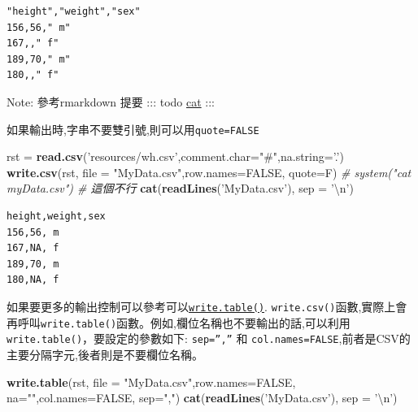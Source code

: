\documentclass[]{book}
\newenvironment{Shaded}{\begin{snugshade}}{\end{snugshade}}
\newcommand{\CharTok}[1]{\textcolor[rgb]{0.31,0.60,0.02}{#1}}
\newcommand{\CommentTok}[1]{\textcolor[rgb]{0.56,0.35,0.01}{\textit{#1}}}
\newcommand{\DataTypeTok}[1]{\textcolor[rgb]{0.13,0.29,0.53}{#1}}
\newcommand{\KeywordTok}[1]{\textcolor[rgb]{0.13,0.29,0.53}{\textbf{#1}}}
\newcommand{\NormalTok}[1]{#1}
\newcommand{\OtherTok}[1]{\textcolor[rgb]{0.56,0.35,0.01}{#1}}
\newcommand{\StringTok}[1]{\textcolor[rgb]{0.31,0.60,0.02}{#1}}
\theoremstyle{definition}
\theoremstyle{definition}
\theoremstyle{definition}
\theoremstyle{remark}
\begin{document}
\begin{verbatim}
"height","weight","sex"
156,56," m"
167,," f"
189,70," m"
180,," f"
\end{verbatim}

Note: 參考rmarkdown 提要 ::: todo
\href{doc:rmarkdown01\#terminal-out}{cat} :::

如果輸出時,字串不要雙引號,則可以用\texttt{quote=FALSE}

\begin{Shaded}
\begin{Highlighting}[]
\NormalTok{rst =}\StringTok{ }\KeywordTok{read.csv}\NormalTok{(}\StringTok{'resources/wh.csv'}\NormalTok{,}\DataTypeTok{comment.char=}\StringTok{"#"}\NormalTok{,}\DataTypeTok{na.string=}\StringTok{'.'}\NormalTok{)}
\KeywordTok{write.csv}\NormalTok{(rst, }\DataTypeTok{file =} \StringTok{"MyData.csv"}\NormalTok{,}\DataTypeTok{row.names=}\OtherTok{FALSE}\NormalTok{, }\DataTypeTok{quote=}\NormalTok{F)}
\CommentTok{# system("cat myData.csv") # 這個不行}
\KeywordTok{cat}\NormalTok{(}\KeywordTok{readLines}\NormalTok{(}\StringTok{'MyData.csv'}\NormalTok{), }\DataTypeTok{sep =} \StringTok{'}\CharTok{\textbackslash{}n}\StringTok{'}\NormalTok{)}
\end{Highlighting}
\end{Shaded}

\begin{verbatim}
height,weight,sex
156,56, m
167,NA, f
189,70, m
180,NA, f
\end{verbatim}

如果要更多的輸出控制可以參考可以\href{http://stat.ethz.ch/R-manual/R-devel/library/utils/html/write.table.html}{\texttt{write.table()}}.
\texttt{write.csv()}函數,實際上會再呼叫\texttt{write.table()}函數。例如,欄位名稱也不要輸出的話,可以利用\texttt{write.table()}，要設定的參數如下:
\texttt{sep=”,”} 和
\texttt{col.names=FALSE},前者是CSV的主要分隔字元,後者則是不要欄位名稱。

\begin{Shaded}
\begin{Highlighting}[]
\KeywordTok{write.table}\NormalTok{(rst, }\DataTypeTok{file =} \StringTok{"MyData.csv"}\NormalTok{,}\DataTypeTok{row.names=}\OtherTok{FALSE}\NormalTok{, }\DataTypeTok{na=}\StringTok{""}\NormalTok{,}\DataTypeTok{col.names=}\OtherTok{FALSE}\NormalTok{, }\DataTypeTok{sep=}\StringTok{","}\NormalTok{)}
\KeywordTok{cat}\NormalTok{(}\KeywordTok{readLines}\NormalTok{(}\StringTok{'MyData.csv'}\NormalTok{), }\DataTypeTok{sep =} \StringTok{'}\CharTok{\textbackslash{}n}\StringTok{'}\NormalTok{)}
\end{Highlighting}
\end{Shaded}
\end{document}
